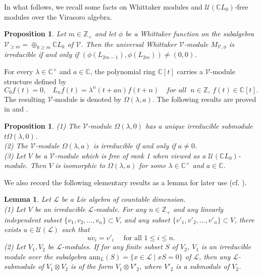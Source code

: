 \documentclass[12pt, reqno]{amsart}
\numberwithin{equation}{section}
\newtheorem{lemma}[theorem]{Lemma}%
\newtheorem{proposition}[theorem]{Proposition}%
\numberwithin{equation}{section}
\def\lmd{\lambda}
\def\U{\mathcal{U}}
\def\V{\mathcal{V}}
\newcommand{\C}{\mathbb C}
\newcommand{\Z}{\mathbb{Z}}
\begin{document}
In what follows, we recall some facts on Whittaker modules and $\U(\C L_0)$-free modules   over the Virasoro algebra.

\begin{proposition}\cite[Theorem 7]{LGZ}\label{prop2.5}
Let $m\in\Z_+$  and let $\phi$ be a Whittaker function on the subalgebra $\V_{\geq m}=\oplus_{k\geq m}\C L_k$ of $\V$. Then the universal Whittaker $\V$-module $M_{\V,\phi}$ is irreducible
 if and only if $\left(\phi(L_{2m-1}),\phi(L_{2m})\right)\neq (0,0)$.
\end{proposition}

For every $\lmd\in\C^\times$ and $a\in\C$, the polynomial ring $\C[t]$ carries
a $\V$-module structure defined by
$$C_0 f(t)=0,\ \ \ \ L_nf(t)=\lmd^n(t+an)f(t+n)\ \ \ \textit{ for all }\ n\in\Z,\ f(t)\in\C[t].$$
The resulting $\V$-module is denoted by $\Omega(\lmd,a)$.
The following results are proved in \cite{LZ2} and \cite[Theorem 3]{TZ}.

\begin{proposition}\label{prop2.6}
(1) The $\V$-module $\Omega(\lmd,0)$ has a unique irreducible submodule $t\Omega(\lmd,0)$.\\
\notag (2) The $\V$-module $\Omega(\lmd,a)$ is irreducible if and only if $a\neq0$.\\
\notag(3) Let $V$ be a $\V$-module which is free of rank 1 when viewed as a $\U(\C L_0)$-module.
 Then $V$ is isomorphic to $\Omega(\lmd,a)$ for some $\lmd\in\C^\times$ and $a\in\C$.
\end{proposition}

We also record the following elementary results as a lemma for later use (cf. \cite[Lemma 6, Theorem 7]{LZ3}).
\begin{lemma}\label{lem2.7}
 Let $\mathcal L$ be a Lie algebra of countable dimension.\\
 (1) Let $V$ be an irreducible $\mathcal L$-module.
 For any $n\in\Z_+$ and any linearly independent subset $\{v_1,v_2,\dots,v_n\}\subset V$,
 and any subset $\{v'_1,v'_2,\dots,v'_n\}\subset V$, there exists $u\in\U(\mathcal L)$ such that
 $$uv_i=v'_i\quad\text{ for all } 1\le i\le n.$$
 (2) Let $V_1,V_2$ be $\mathcal L$-modules.
 If for any finite subset $S$ of $V_2$, $V_1$ is an irreducible module over the subalgebra
 $\mathrm{ann}_L(S)=\{x\in\mathcal L\mid xS=0\}$ of $\mathcal L$,
 then any $\mathcal L$-submodule of $V_1\otimes V_2$ is of the form $V_1\otimes V'_2$,
 where $V'_2$ is a submodule of $V_2$.
\end{lemma}
\end{document}
